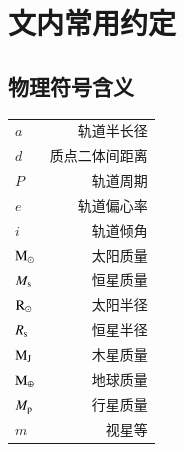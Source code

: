 
\chapter{文内常用约定} \label{apdx:nomenclature}
\section{物理符号含义} \label{apdx:symbol}
\begin{multicols}{2}
\begin{tabularx}{1.0\linewidth}{@{\extracolsep{\fill}}lr}
\centering
$a$      	     			&     轨道半长径 		\\
$d$      	     			&     质点二体间距离	 	\\
$P$      	     			&     轨道周期	 		\\
$e$      	     			&     轨道偏心率 		\\
$i$          	     			&     轨道倾角 			\\
$\mathrm{M}_\odot$          		&     太阳质量   			\\
$M_\mathrm{s}$          		&     恒星质量   			\\
$\mathrm{R}_\odot$          		&     太阳半径   			\\
$R_\mathrm{s}$          		&     恒星半径   			\\
$\mathrm{M}_\mathrm{J}$          		&     木星质量   			\\
$\mathrm{M}_\oplus$          	&     地球质量   			\\
$M_\mathrm{p}$         	 	&     行星质量   			\\
$m$         	 			&     视星等   			\\

\end{tabularx}
\columnbreak



\end{multicols}

\newpage


